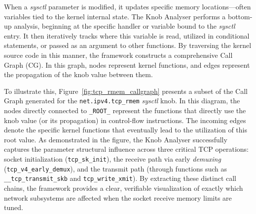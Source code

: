 When a \textit{sysctl} parameter is modified, it updates specific memory locations—often variables tied to the kernel internal state.
The Knob Analyser performs a bottom-up analysis, beginning at the specific handler or variable bound to the \textit{sysctl} entry.
It then iteratively tracks where this variable is read, utilized in conditional statements, or passed as an argument to other functions.
By traversing the kernel source code in this manner, the framework constructs a comprehensive Call Graph (CG).
In this graph, nodes represent kernel functions, and edges represent the propagation of the knob value between them.

To illustrate this, Figure~\ref{fig:tcp_rmem_callgraph} presents a subset of the Call Graph generated for the \texttt{net.ipv4.tcp\_rmem} \textit{sysctl} knob.
In this diagram, the nodes directly connected to \texttt{\_ROOT\_} represent the functions that directly use the knob value (or its propagation) in control-flow instructions.
The incoming edges denote the specific kernel functions that eventually lead to the utilization of this root value.
As demonstrated in the figure, the Knob Analyser successfully captures the parameter structural influence across three critical TCP operations: socket initialization (\texttt{tcp\_sk\_init}), the receive path via early \textit{demuxing} (\texttt{tcp\_v4\_early\_demux}), and the transmit path (through functions such as \texttt{\_\_tcp\_transmit\_skb} and \texttt{tcp\_write\_xmit}).
By extracting these distinct call chains, the framework provides a clear, verifiable visualization of exactly which network subsystems are affected when the socket receive memory limits are tuned.

